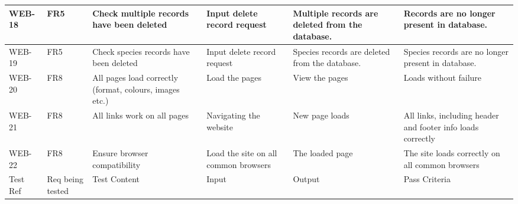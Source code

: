 \documentclass[10pt,a4paper]{article}
\begin{document}
\begin{center}
\begin{tabular}{| p{1.5cm} | p{1.8cm} | p{3cm} | p{2cm} | p{3cm} | p{3cm} | }
		WEB-18 & FR5 & Check multiple records have been deleted & Input delete record request & Multiple records are deleted from the database. & Records are no longer present in database. \\ \hline
		WEB-19 & FR5 & Check species records have been deleted & Input delete record request & Species records are deleted from the database. & Species records are no longer present in database. \\ \hline
		WEB-20 & FR8 & All pages load correctly (format, colours, images etc.) & Load the pages & View the pages & Loads without failure \\ \hline
		WEB-21 & FR8 & All links work on all pages & Navigating the website & New page loads & All links, including header and footer info loads correctly \\ \hline
		WEB-22 & FR8 & Ensure browser compatibility & Load the site on all common browsers & The loaded page & The site loads correctly on all common browsers \\ \hline
		\hline
		\rowcolor{Blue}
		Test Ref & Req being tested & Test Content & Input & Output & Pass Criteria \\ \hline
	\end{tabular}


\end{center}
\end{document}

